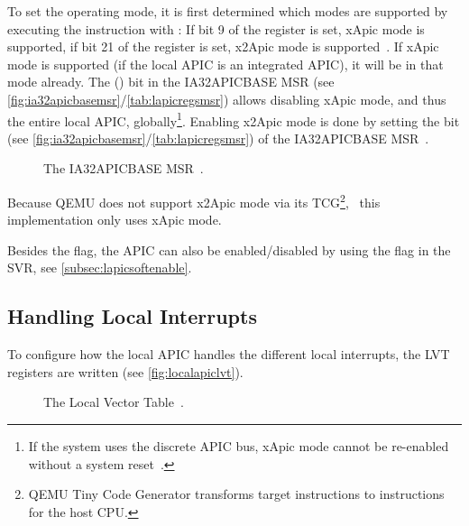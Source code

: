 To set the operating mode, it is first determined which modes are supported by executing the  instruction with : If bit 9 of the  register is set, xApic mode is supported, if bit 21 of the  register is set, x2Apic mode is supported~\autocite[sec.~5.1.2]{cpuid}.
If xApic mode is supported (if the local APIC is an integrated APIC), it will be in that mode already.
The  () bit in the IA32\textunderscore{}APIC\textunderscore{}BASE MSR (see \autoref{fig:ia32apicbasemsr}/\autoref{tab:lapicregsmsr}) allows disabling xApic mode, and thus the entire local APIC, globally\footnote{
  If the system uses the discrete APIC bus, xApic mode cannot be re-enabled without a system reset~\autocite[sec.~3.11.4.3]{ia32}.}.
Enabling x2Apic mode is done by setting the  bit (see \autoref{fig:ia32apicbasemsr}/\autoref{tab:lapicregsmsr}) of the IA32\textunderscore{}APIC\textunderscore{}BASE MSR~\autocite[sec.~3.11.4.3]{ia32}.

\begin{figure}[h]
  \centering
  \begin{subfigure}[b]{0.7\textwidth}
    
  \end{subfigure}
  \caption{The IA32\textunderscore{}APIC\textunderscore{}BASE MSR~\autocite[sec.~3.11.4.4]{ia32}.}
  \label{fig:ia32apicbasemsr}
\end{figure}

Because QEMU does not support x2Apic mode via its TCG\footnote{
  QEMU Tiny Code Generator transforms target instructions to instructions for the host CPU.},
\ this implementation only uses xApic mode.

Besides the  flag, the APIC can also be enabled/disabled by using the  flag in the SVR, see \autoref{subsec:lapicsoftenable}.

\subsection{Handling Local Interrupts}
\label{subsec:lapiclvtinit}

To configure how the local APIC handles the different local interrupts, the LVT registers are written (see \autoref{fig:localapiclvt}).

\begin{figure}[h]
  \centering
  \begin{subfigure}[b]{0.7\textwidth}
    
  \end{subfigure}
  \caption{The Local Vector Table~\autocite[sec.~3.11.5.1]{ia32}.}
  \label{fig:localapiclvt}
\end{figure}

